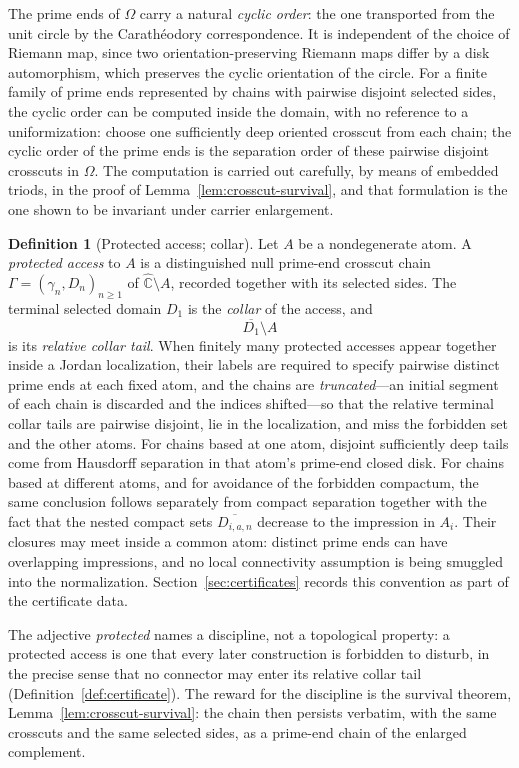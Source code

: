 \documentclass[11pt,reqno]{amsart}
\theoremstyle{definition}
\newtheorem{definition}[theorem]{Definition}
\theoremstyle{remark}
\newcommand{\Chat}{\widehat{\mathbb C}}
\begin{document}
The prime ends of $\Omega$ carry a natural \emph{cyclic order}: the one
transported from the unit circle by the Carath\'eodory correspondence.
It is independent of the choice of Riemann map, since two
orientation-preserving Riemann maps differ by a disk automorphism, which
preserves the cyclic orientation of the circle.  For a finite family of
prime ends represented by chains with pairwise disjoint selected sides,
the cyclic order can be computed inside the domain, with no reference to
a uniformization: choose one sufficiently deep oriented crosscut from
each chain; the cyclic order of the prime ends is the separation order of
these pairwise disjoint crosscuts in $\Omega$.  The computation is
carried out carefully, by means of embedded triods, in the proof of
Lemma~\ref{lem:crosscut-survival}, and that formulation is the one shown
to be invariant under carrier enlargement.

\begin{definition}[Protected access; collar]\label{def:A-protected}
Let $A$ be a nondegenerate atom.  A \emph{protected access} to $A$ is a
distinguished null prime-end crosscut chain
$\Gamma=(\gamma_n,D_n)_{n\ge1}$ of $\Chat\setminus A$, recorded together
with its selected sides.  The terminal selected domain $D_1$ is the
\emph{collar} of the access, and
\[
 \overline{D_1}\setminus A
\]
is its \emph{relative collar tail}.  When finitely many protected accesses
appear together inside a Jordan localization, their labels are required to
specify pairwise distinct prime ends at each fixed atom, and the chains are
\emph{truncated}---an initial segment of each chain is discarded and the
indices shifted---so that the relative terminal collar tails are pairwise
disjoint, lie in the localization, and miss the forbidden set and the other
atoms.  For chains based at one atom, disjoint sufficiently deep tails come
from Hausdorff separation in that atom's prime-end closed disk.  For chains
based at different atoms, and for avoidance of the forbidden compactum, the
same conclusion follows separately from compact separation together with
the fact that the nested compact sets
$\overline{D_{i,a,n}}$ decrease to the impression in $A_i$.
Their closures may meet inside a common atom: distinct prime ends can have
overlapping impressions, and no local connectivity assumption is being
smuggled into the normalization.  Section~\ref{sec:certificates} records
this convention as part of the certificate data.
\end{definition}

The adjective \emph{protected} names a discipline, not a topological
property: a protected access is one that every later construction is
forbidden to disturb, in the precise sense that no connector may enter
its relative collar tail (Definition~\ref{def:certificate}).  The reward for the
discipline is the survival theorem, Lemma~\ref{lem:crosscut-survival}:
the chain then persists verbatim, with the same crosscuts and the same
selected sides, as a prime-end chain of the enlarged complement.
\end{document}
